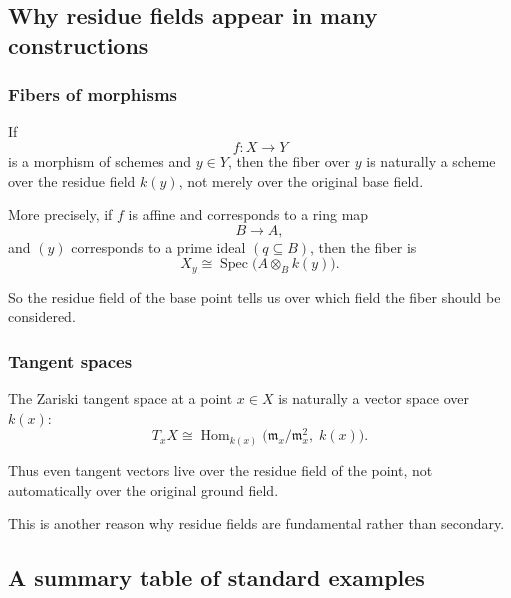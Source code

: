 \documentclass[12pt,a4paper]{article}
\theoremstyle{notespace}
\newcommand{\Spec}{\operatorname{Spec}}
\newcommand{\m}{\mathfrak m}
\theoremstyle{definition}
\begin{document}
\subsection{Why residue fields appear in many constructions}

\subsubsection{Fibers of morphisms}

If
\[
f:X\to Y
\]
is a morphism of schemes and \(y\in Y\), then the fiber over \(y\) is naturally a scheme over the residue field \(k(y)\), not merely over the original base field.

More precisely, if \(f\) is affine and corresponds to a ring map
\[
B\to A,
\]
and $(y)$ corresponds to a prime ideal $(q \subseteq B)$, then the fiber is
\[
X_y \cong \Spec\!\bigl(A\otimes_B k(y)\bigr).
\]

So the residue field of the base point tells us over which field the fiber should be considered.



\subsubsection{Tangent spaces}

The Zariski tangent space at a point \(x\in X\) is naturally a vector space over \(k(x)\):
\[
T_xX \cong \operatorname{Hom}_{k(x)}\!\bigl(\m_x/\m_x^2,\;k(x)\bigr).
\]

Thus even tangent vectors live over the residue field of the point, not automatically over the original ground field.

This is another reason why residue fields are fundamental rather than secondary.

\subsection{A summary table of standard examples}
\end{document}
